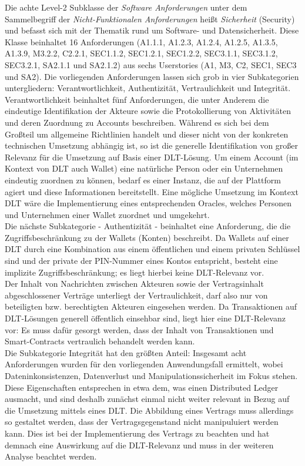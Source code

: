 Die achte Level-2 Subklasse der \textit{Software Anforderungen} unter dem Sammelbegriff der \textit{Nicht-Funktionalen Anforderungen} heißt \textit{Sicherheit} (Security) und befasst sich mit der Thematik rund um Software- und Datensicherheit. Diese Klasse beinhaltet 16 Anforderungen (A1.1.1, A1.2.3, A1.2.4, A1.2.5, A1.3.5, A1.3.9, M3.2.2, C2.2.1, SEC1.1.2, SEC1.2.1, SEC1.2.2, SEC3.1.1, SEC3.1.2, SEC3.2.1, SA2.1.1 und SA2.1.2) aus sechs Userstories (A1, M3, C2, SEC1, SEC3 und SA2). Die vorliegenden Anforderungen lassen sich grob in vier Subkategorien untergliedern: Verantwortlichkeit, Authentizität, Vertraulichkeit und Integrität. Verantwortlichkeit beinhaltet fünf Anforderungen, die unter Anderem die eindeutige Identifikation der Akteure sowie die Protokollierung von Aktivitäten und deren Zuordnung zu Accounts beschreiben. Während es sich bei dem Großteil um allgemeine Richtlinien handelt und dieser nicht von der konkreten technischen Umsetzung abhängig ist, so ist die generelle Identifikation von großer Relevanz für die Umsetzung auf Basis einer \ac{DLT}-Lösung. Um einem Account (im Kontext von \ac{DLT} auch Wallet) eine natürliche Person oder ein Unternehmen eindeutig zuordnen zu können, bedarf es einer Instanz, die auf der Plattform agiert und diese Informationen bereitstellt. Eine mögliche Umsetzung im Kontext \ac{DLT} wäre die Implementierung eines entsprechenden Oracles, welches Personen und Unternehmen einer Wallet zuordnet und umgekehrt.\\
Die nächste Subkategorie - Authentizität - beinhaltet eine Anforderung, die die Zugriffsbeschränkung zu der Wallets (Konten) beschreibt. Da Wallets auf einer \ac{DLT} durch eine Kombination aus einem öffentlichen und einem privaten Schlüssel sind und der private der PIN-Nummer eines Kontos entspricht, besteht eine implizite Zugriffsbeschränkung; es liegt hierbei keine \ac{DLT}-Relevanz vor.\\
Der Inhalt von Nachrichten zwischen Akteuren sowie der Vertragsinhalt abgeschlossener Verträge unterliegt der Vertraulichkeit, darf also nur von beteiligten bzw. berechtigten Akteuren eingesehen werden. Da Transaktionen auf \ac{DLT}-Lösungen generell öffentlich einsehbar sind, liegt hier eine \ac{DLT}-Relevanz vor: Es muss dafür gesorgt werden, dass der Inhalt von Transaktionen und Smart-Contracts vertraulich behandelt werden kann.\\
Die Subkategorie Integrität hat den größten Anteil: Insgesamt acht Anforderungen wurden für den vorliegenden Anwendungsfall ermittelt, wobei Dateninkonsistenzen, Datenverlust und Manipulationssicherheit im Fokus stehen. Diese Eigenschaften entsprechen in etwa dem, was einen Distributed Ledger ausmacht, und sind deshalb zunächst einmal nicht weiter relevant in Bezug auf die Umsetzung mittels eines \ac{DLT}. Die Abbildung eines Vertrags muss allerdings so gestaltet werden, dass der Vertragsgegenstand nicht manipuluiert werden kann. Dies ist bei der Implementierung des Vertrags zu beachten und hat demnach eine Auswirkung auf die \ac{DLT}-Relevanz und muss in der weiteren Analyse beachtet werden.


